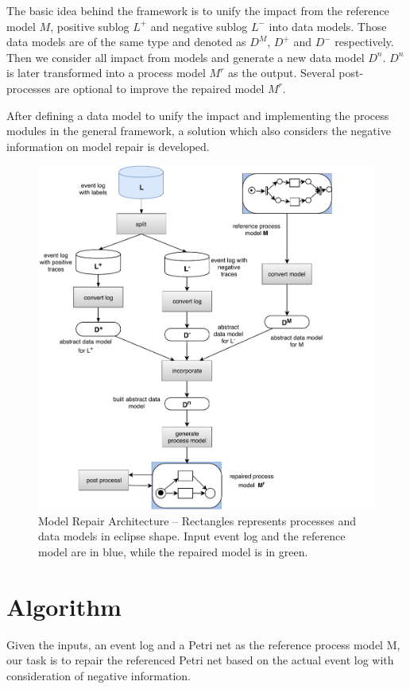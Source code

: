 The basic idea behind the framework is to unify the impact from the reference model $M$, positive sublog $L^+$ and negative sublog $L^-$ into data models. Those data models are of the same type and denoted as $D^M$, $D^+$ and $D^-$ respectively. Then we consider all impact from models and generate a new data model $D^n$. $D^n$ is later transformed into a process model $M^r$ as the output. Several post-processes are optional to improve the repaired model $M^r$.

After defining a data model to unify the impact and implementing the process modules in the general framework, a solution which also considers the negative information on model repair is developed. 
\begin{figure}
	\includegraphics{figures/algorithm/FD_framework.pdf}
	\caption[Model Repair Architecture]{Model Repair Architecture -- \small Rectangles represents processes and data models in eclipse shape. Input event log and the reference model are in blue, while the repaired model is in green.}
	\label{fig:framework}
\end{figure} 
\section{Algorithm}
Given the inputs, an event log and a Petri net as the reference process model M, our task is to repair the referenced Petri net based on the actual event log with consideration of negative information. 

